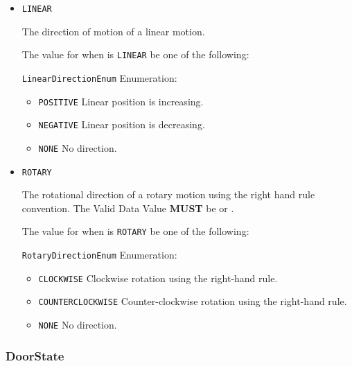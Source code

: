 \begin{itemize}

\item \texttt{LINEAR}


The direction of motion of a linear motion.


The value for  when  is \texttt{LINEAR} \MUST be one of the following: 


\texttt{LinearDirectionEnum} Enumeration:

\begin{itemize}
\item \texttt{POSITIVE} \newline Linear position is increasing. 
\item \texttt{NEGATIVE} \newline Linear position is decreasing. 
\item \texttt{NONE} \newline No direction. 
\end{itemize}

\item \texttt{ROTARY}


The rotational direction of a rotary motion using the right hand rule convention.
 The \gls{Valid Data Value} \textbf{MUST} be  or .


The value for  when  is \texttt{ROTARY} \MUST be one of the following: 


\texttt{RotaryDirectionEnum} Enumeration:

\begin{itemize}
\item \texttt{CLOCKWISE} \newline Clockwise rotation using the right-hand rule. 
\item \texttt{COUNTER\textunderscore CLOCKWISE} \newline Counter-clockwise rotation using the right-hand rule. 
\item \texttt{NONE} \newline No direction. 
\end{itemize}


\end{itemize}

\subsubsection{DoorState}
\label{sec:DoorState}



